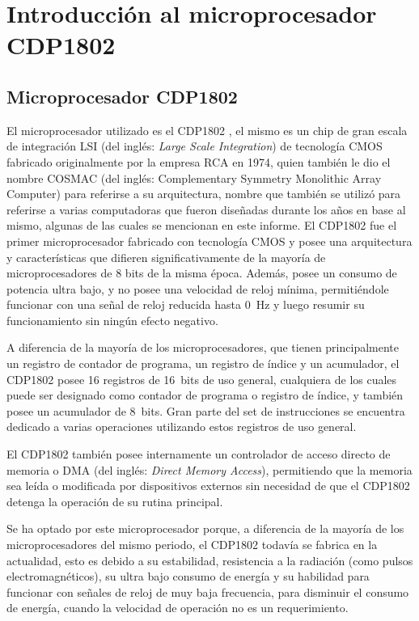   \chapter{Introducción al microprocesador CDP1802} 
\label{C:antecedentes}

\section{Microprocesador CDP1802}


El microprocesador utilizado es el CDP1802 \cite{cdp1802_datasheet}, el mismo es un chip de gran escala de integración LSI (del inglés: \emph{Large Scale Integration}) de tecnología CMOS fabricado originalmente por la empresa RCA en 1974, quien también le dio el nombre COSMAC \cite{cdp1802_lab_report} (del inglés: Complementary Symmetry Monolithic Array Computer) para referirse a su arquitectura, nombre que también se utilizó para referirse a varias computadoras que fueron diseñadas durante los años en base al mismo, algunas de las cuales se mencionan en este informe. El CDP1802 fue el primer microprocesador fabricado con tecnología CMOS \cite{cdp1802_Chip_Hall_of_Fame} y posee una arquitectura y características que difieren significativamente de la mayoría de microprocesadores de 8 bits de la misma época. Además, posee un consumo de potencia ultra bajo, y no posee una velocidad de reloj mínima, permitiéndole funcionar con una señal de reloj reducida hasta \num{0}~\unit{\hertz} y luego resumir su funcionamiento sin ningún efecto negativo.

A diferencia de la mayoría de los microprocesadores, que tienen principalmente un registro de contador de programa, un registro de índice y un acumulador, el CDP1802 posee 16 registros de 16~bits de uso general, cualquiera de los cuales puede ser designado como contador de programa o registro de índice, y también posee un acumulador de 8~bits. Gran parte del set de instrucciones se encuentra dedicado a varias operaciones utilizando estos registros de uso general.

El CDP1802 también posee internamente un controlador de acceso directo de memoria o DMA (del inglés: \emph{Direct Memory Access}), permitiendo que la memoria sea leída o modificada por dispositivos externos sin necesidad de que el CDP1802 detenga la operación de su rutina principal.

Se ha optado por este microprocesador porque, a diferencia de la mayoría de los microprocesadores del mismo periodo, el CDP1802 todavía se fabrica en la actualidad, esto es debido a su estabilidad, resistencia a la radiación (como pulsos electromagnéticos), su ultra bajo consumo de energía y su habilidad para funcionar con señales de reloj de muy baja frecuencia, para disminuir el consumo de energía, cuando la velocidad de operación no es un requerimiento.

